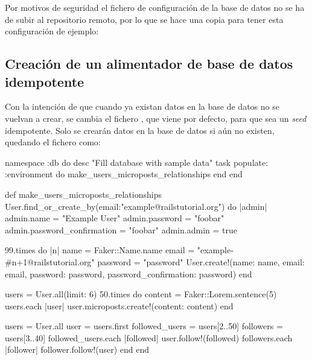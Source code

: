 Por motivos de seguridad el fichero de configuración de la base de datos no se ha de subir al repositorio remoto, por lo que se hace una copia para tener esta configuración de ejemplo:


\subsection{Creación de un alimentador de base de datos idempotente}

Con la intención de que cuando ya existan datos en la base de datos no se vuelvan a crear, se cambia el fichero , que viene por defecto, para que sea un \textit{seed} idempotente. Solo se crearán datos en la base de datos si aún no existen, quedando el fichero como:

\begin{codelisting}
\label{code:idempotentseed}
\begin{code}
namespace :db do
  desc "Fill database with sample data"
  task populate: :environment do
    make_users_microposts_relationships
  end
end

def make_users_microposts_relationships
  User.find_or_create_by(email:"example@railstutorial.org") do |admin| 
  	admin.name = "Example User"
	admin.password = "foobar"
        admin.password_confirmation = "foobar"
        admin.admin = true

	99.times do |n|
	    name  = Faker::Name.name
	    email = "example-#{n+1}@railstutorial.org"
	    password  = "password"
	    User.create!(name:     name,
                 email:    email,
                 password: password,
                 password_confirmation: password)
        end

	users = User.all(limit: 6)
  	50.times do
	    content = Faker::Lorem.sentence(5)
	    users.each { |user| user.microposts.create!(content: content) }
	end  

	users = User.all
	user  = users.first
	followed_users = users[2..50]
	followers      = users[3..40]
	followed_users.each { |followed| user.follow!(followed) }
	followers.each      { |follower| follower.follow!(user) }
  end
end
\end{code}
\end{codelisting}


